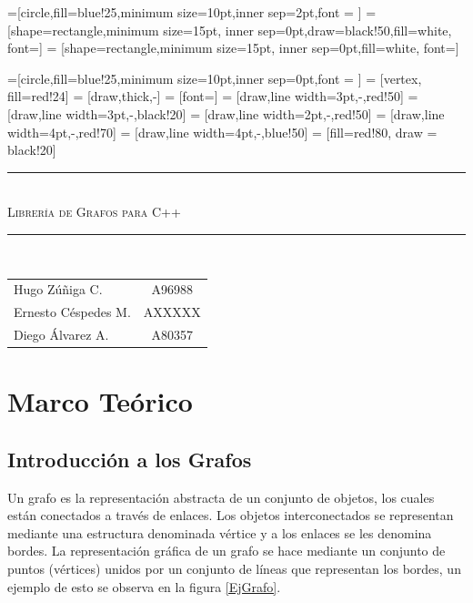\documentclass[a4paper, 11pt]{report}
\newcommand{\HRule}[1]{\rule{\linewidth}{#1}}
\begin{document}
=[circle,fill=blue!25,minimum size=10pt,inner sep=2pt,font = \small]
 = [shape=rectangle,minimum size=15pt, inner sep=0pt,draw=black!50,fill=white, font=\scriptsize]
 = [shape=rectangle,minimum size=15pt, inner sep=0pt,fill=white, font=\footnotesize]

=[circle,fill=blue!25,minimum size=10pt,inner sep=0pt,font = \tiny]
 = [vertex, fill=red!24]
 = [draw,thick,-]
 = [font=\scriptsize]
 = [draw,line width=3pt,-,red!50]
 = [draw,line width=3pt,-,black!20]
 = [draw,line width=2pt,-,red!50]
 = [draw,line width=4pt,-,red!70]
 = [draw,line width=4pt,-,blue!50]
 = [fill=red!80, draw = black!20]

\begin{titlepage}
    \begin{center}
        \HRule{0.5mm}\\[0.12cm]
        \textsc{\huge Librer\'ia de Grafos para C++}\\[0.2cm]
        \HRule{0.8mm}\\[1.7cm]
        \begin{flushright}
        \begin{tabular}{l c}
            Hugo Z\'u\~niga C. & A96988 \\
            Ernesto C\'espedes M. & AXXXXX \\
            Diego \'Alvarez A. & A80357 \\
        \end{tabular}
        \end{flushright}

    \end{center}
\end{titlepage}

\chapter{Marco Te\'orico}
\section{Introducci\'on a los Grafos}
Un grafo es la representaci\'on abstracta de un conjunto de objetos, los cuales est\'an conectados a trav\'es de enlaces. Los objetos interconectados se representan mediante una estructura denominada v\'ertice y a los enlaces se les denomina bordes. La representaci\'on  gr\'afica de un grafo se hace mediante un conjunto de puntos (v\'ertices) unidos por un conjunto de l\'ineas que representan los bordes, un ejemplo de esto se observa en la figura \ref{EjGrafo}.
\end{document}
